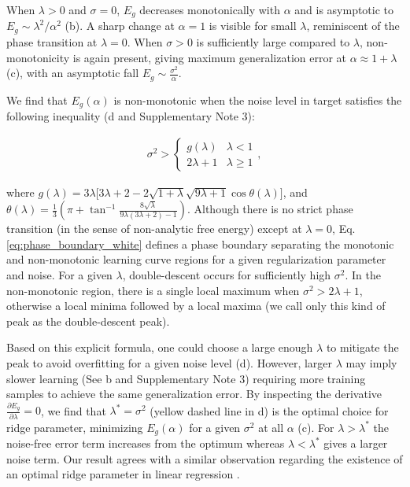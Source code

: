 \documentclass[11pt]{article}
\begin{document}
When $\lambda > 0$ and $\sigma = 0$, $E_g$ decreases monotonically with $\alpha$ and is asymptotic to $E_g \sim {{\lambda}^2}/{\alpha^2}$ (b). A sharp change at $\alpha =1$ is visible for small $\lambda$, reminiscent of the phase transition at $\lambda = 0$. When $\sigma > 0$ is sufficiently large compared to $\lambda$, non-monotonicity is again present, giving maximum generalization error at $\alpha \approx 1 + \lambda$ (c), with an asymptotic fall $E_g \sim \frac{\sigma^2}{\alpha}$.

We find that $E_g(\alpha)$ is  non-monotonic when the noise level in target satisfies the following inequality (d and Supplementary Note 3):
\begin{linenomath*}\begin{align}\label{eq:phase_boundary_white}
	\sigma^2 > \begin{cases} 
    g(\lambda) & \lambda< 1 \\
    2\lambda+1 & \lambda\geq 1
   \end{cases},
\end{align}\end{linenomath*}
where $g(\lambda) = 3\lambda\big[3\lambda+2-2\sqrt{1+\lambda}\sqrt{9\lambda+1}\cos\theta(\lambda)\big]$, and $ \theta(\lambda) = \frac{1}{3}\left(\pi+\tan^{-1}\frac{8\sqrt{\lambda}}{9\lambda(3\lambda+2)-1}\right)$. Although there is no strict phase transition (in the sense of non-analytic free energy) except at $\lambda=0$, Eq. \eqref{eq:phase_boundary_white} defines a phase boundary separating the monotonic and non-monotonic learning curve regions for a given regularization parameter and noise. For a given $\lambda$, double-descent occurs for sufficiently high $\sigma^2$.  In the non-monotonic region, there is a single local maximum when $\sigma^2 > 2\lambda + 1$, otherwise a local minima followed by a local maxima (we call only this kind of peak as the double-descent peak).

Based on this explicit formula, one could choose a large enough $\lambda$ to mitigate the peak to avoid overfitting for a given noise level (d). However, larger $\lambda$ may imply slower learning (See b and Supplementary Note 3) requiring more training samples to achieve the same generalization error. By inspecting the derivative $\frac{\partial E_g}{\partial \lambda}=0$, we find that $\lambda^* = \sigma^2$ (yellow dashed line in d) is the optimal choice for ridge parameter, minimizing $E_g(\alpha)$ for a given $\sigma^2$ at all $\alpha$ (c). For $\lambda > \lambda^*$ the noise-free error term increases from the optimum whereas $\lambda<\lambda^*$ gives a larger noise term. Our result agrees with a similar observation regarding the existence of an optimal ridge parameter in linear regression \cite{nakkiran2020optimal}.
\end{document}
